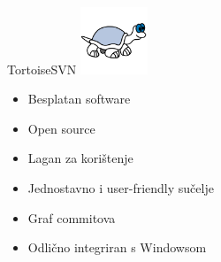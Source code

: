 





































































































\begin{frame}{TortoiseSVN}
\includegraphics[width=2cm, height=2cm]{tortoise4.png}
\begin{itemize}
    \item Besplatan software
    \item Open source
    \item Lagan za korištenje
    \item Jednostavno i user-friendly sučelje
    \item Graf commitova
    \item Odlično integriran s Windowsom
\end{itemize}
\end{frame}

